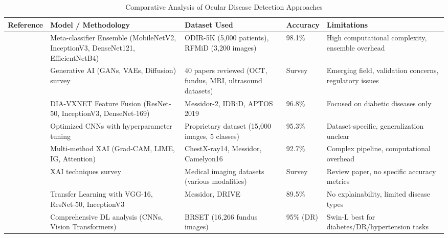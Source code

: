 
\begin{table}[t]
\caption{Comparative Analysis of Ocular Disease Detection Approaches}
\label{tab:comparison}
\centering
\small
\renewcommand{\arraystretch}{1.3}
\setlength{\tabcolsep}{4pt}

\begin{tabular}{|p{1.8cm}|p{3.5cm}|p{3.8cm}|p{1.5cm}|p{3.2cm}|}
\hline
\textbf{Reference} 
& \textbf{Model / Methodology} 
& \textbf{Dataset Used} 
& \textbf{Accuracy} 
& \textbf{Limitations} \\
\hline

~\cite{R10} 
& Meta-classifier Ensemble (MobileNetV2, InceptionV3, DenseNet121, EfficientNetB4) 
& ODIR-5K (5,000 patients), RFMiD (3,200 images) 
& 98.1\% 
& High computational complexity, ensemble overhead \\
\hline

~\cite{R9} 
& Generative AI (GANs, VAEs, Diffusion) survey 
& 40 papers reviewed (OCT, fundus, MRI, ultrasound datasets) 
& Survey 
& Emerging field, validation concerns, regulatory issues \\
\hline

~\cite{R6} 
& DIA-VXNET Feature Fusion (ResNet-50, InceptionV3, DenseNet-169) 
& Messidor-2, IDRiD, APTOS 2019 
& 96.8\% 
& Focused on diabetic diseases only \\
\hline

~\cite{R5} 
& Optimized CNNs with hyperparameter tuning 
& Proprietary dataset (15,000 images, 5 classes) 
& 95.3\% 
& Dataset-specific, generalization unclear \\
\hline

~\cite{R4} 
& Multi-method XAI (Grad-CAM, LIME, IG, Attention) 
& ChestX-ray14, Messidor, Camelyon16 
& 92.7\% 
& Complex pipeline, computational overhead \\
\hline

~\cite{R3} 
& XAI techniques survey 
& Medical imaging datasets (various modalities) 
& Survey 
& Review paper, no specific accuracy metrics \\
\hline

~\cite{R1} 
& Transfer Learning with VGG-16, ResNet-50, InceptionV3 
& Messidor, DRIVE 
& 89.5\% 
& No explainability, limited disease types \\
\hline

~\cite{R7} 
& Comprehensive DL analysis (CNNs, Vision Transformers) 
& BRSET (16,266 fundus images) 
& 95\% (DR) 
& Swin-L best for diabetes/DR/hypertension tasks \\
\hline


\end{tabular}
\end{table}
